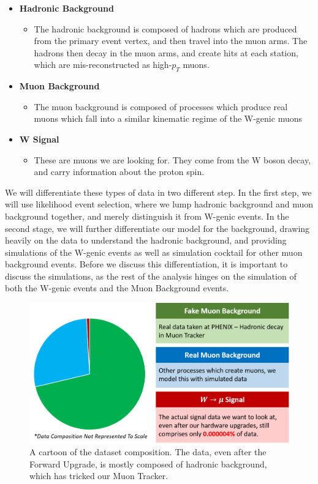 \begin{itemize}
  \item \textbf{Hadronic Background}
    \begin{itemize}
      \item The hadronic background is composed of hadrons which are produced
        from the primary event vertex, and then travel into the muon arms. The
        hadrons then decay in the muon arms, and create hits at each station,
        which are mis-reconstructed as high-$p_T$ muons.
    \end{itemize}
  \item \textbf{Muon Background}
    \begin{itemize}
        \item The muon background is composed of processes which produce real
          muons which fall into a similar kinematic regime of the W-genic muons
    \end{itemize}
  \item \textbf{W Signal}
    \begin{itemize}
        \item These are muons we are looking for. They come from the W boson
          decay, and carry information about the proton spin.
    \end{itemize}
\end{itemize}

We will differentiate these types of data in two different step. In the first
step, we will use likelihood event selection, where we lump hadronic background
and muon background together, and merely distinguish it from W-genic events. In
the second stage, we will further differentiate our model for the background,
drawing heavily on the data to understand the hadronic background, and providing
simulations of the W-genic events as well as simulation cocktail for other muon
background events. Before we discuss this differentiation, it is important to
discuss the simulations, as the rest of the analysis hinges on the simulation of
both the W-genic events and the Muon Background events.

\begin{figure}[ht]
  \centering
  \includegraphics[width=0.8\linewidth]{./figures/data_composition.png}
  \caption{
    A cartoon of the dataset composition. The data, even after the Forward
    Upgrade, is mostly composed of hadronic background, which has tricked our
    Muon Tracker.
  }
  \label{fig:data_composition}
\end{figure}

